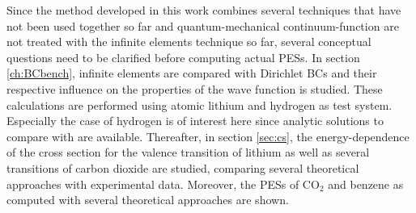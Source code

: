 \label{ch:res}
Since the method developed in this work combines several techniques that have not been used together so far and quantum-mechanical continuum-function are not treated with the infinite elements technique so far, several conceptual questions need to be clarified before computing actual PESs.
In section \ref{ch:BCbench}, infinite elements are compared with Dirichlet BCs and their respective influence on the properties of the wave function is studied. %
These calculations are performed using atomic lithium and hydrogen as test system.
Especially the case of hydrogen is of interest here since analytic solutions to compare with are available.
Thereafter, in section \ref{sec:cs}, the energy-dependence of the cross section for the valence transition of lithium as well as several transitions of carbon dioxide are studied, comparing several theoretical approaches with experimental data.
Moreover, the PESs of CO$_2$ and benzene as computed with several theoretical approaches are shown.

